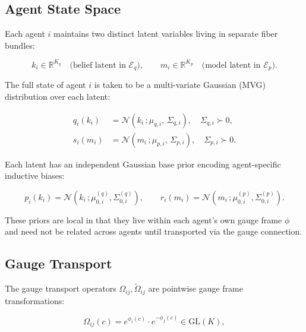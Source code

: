 \documentclass[twoside,11pt]{article}
\begin{document}
\subsection{Agent State Space}

Each agent $i$ maintains two distinct latent variables living in separate fiber bundles:

\begin{equation}
k_i \in \mathbb{R}^{K_q} \quad \text{(belief latent in $\mathcal{E}_q$)},
\qquad
m_i \in \mathbb{R}^{K_p} \quad \text{(model latent in $\mathcal{E}_p$)}.
\label{eq:dual_latents}
\end{equation}

The full state of agent $i$ is taken to be a multi-variate Gaussian (MVG) distribution over each latent:

\begin{equation}
\begin{aligned}
q_i(k_i) &= \mathcal{N}(k_i\,;\mu_{q,i},\,\Sigma_{q,i}),
\quad \Sigma_{q,i} \succ 0,\\
s_i(m_i) &= \mathcal{N}(m_i\,;\mu_{p,i},\,\Sigma_{p,i}),
\quad \Sigma_{p,i} \succ 0.
\end{aligned}
\label{eq:gaussian_states}
\end{equation}

Each latent has an independent Gaussian base prior encoding agent-specific inductive biases:

\begin{equation}
p_i(k_i) = \mathcal{N}(k_i\,; \mu_{0,i}^{(q)}, \Sigma_{0,i}^{(q)}),
\qquad
r_i(m_i) = \mathcal{N}(m_i\,; \mu_{0,i}^{(p)}, \Sigma_{0,i}^{(p)}).
\label{eq:base_priors}
\end{equation}

These priors are local in that they live within each agent's own gauge frame $\phi$ and need not be related across agents until transported via the gauge connection.

\subsection{Gauge Transport}

The gauge transport operators $\Omega_{ij}, \tilde{\Omega}_{ij}$ are pointwise gauge frame transformations:

\begin{equation}
\Omega_{ij}(c) = e^{\phi_i(c)} \cdot e^{-\phi_j(c)} \in \mathrm{GL}(K),
\label{eq:gauge_frame_rotation}
\end{equation}
\end{document}
